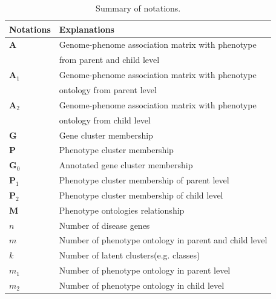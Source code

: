 \documentclass{bmcart}
\begin{document}
\begin{table}[t!]
 \caption{Summary of notations.}\label{Tab:Notations}
\begin{tabular}{|l|l|}
    \hline
    Notations & Explanations\\
    \hline\hline
    $\bm{A}$ & Genome-phenome association matrix with phenotype \\
    & from parent and child level\\
    $\bm{A}_1$ & Genome-phenome association matrix with phenotype\\
    & ontology from parent level\\
    $\bm{A}_2$ & Genome-phenome association matrix with phenotype\\
    & ontology from child level\\
    $\bm{G}$ & Gene cluster membership\\
    $\bm{P}$ & Phenotype cluster membership\\
    $\bm{G}_0$ & Annotated gene cluster membership\\
    $\bm{P}_1$ & Phenotype cluster membership of parent level\\
    $\bm{P}_2$ & Phenotype cluster membership of child level\\
    $\bm{M}$ & Phenotype ontologies relationship\\
    $n$ & Number of disease genes\\
    $m$ & Number of phenotype ontology in parent and child level\\
    $k$ & Number of latent clusters(e.g. classes)\\
    $m_1$ & Number of phenotype ontology in parent level\\
    $m_2$ & Number of phenotype ontology in child level\\
    \hline
  \end{tabular}
\end{table}
\end{document}
